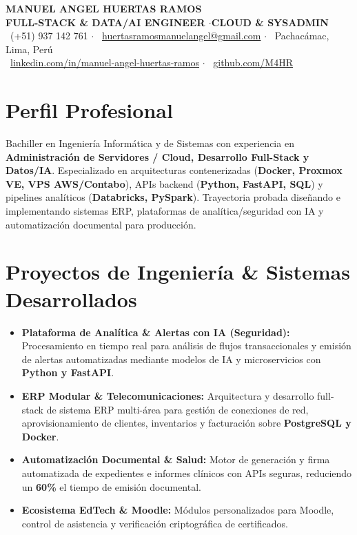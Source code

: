 \documentclass[10pt, a4paper]{article}
\begin{document}
\begin{center}
    {\LARGE \scshape \bfseries \color{primary} MANUEL ANGEL HUERTAS RAMOS}\\[0.2em]
    {\small \bfseries \color{subtitle} FULL-STACK \& DATA/AI ENGINEER \quad$\cdot$\quad CLOUD \& SYSADMIN}\\[0.25em]
    {\footnotesize
    \faPhone\ (+51) 937 142 761 \quad$\cdot$\quad
    \faEnvelope\ \href{mailto:huertasramosmanuelangel@gmail.com}{huertasramosmanuelangel@gmail.com} \quad$\cdot$\quad
    \faMapMarker*\ Pachacámac, Lima, Perú\\[0.15em]
    \faLinkedin\ \href{https://www.linkedin.com/in/manuel-angel-huertas-ramos-7b588a196/}{linkedin.com/in/manuel-angel-huertas-ramos} \quad$\cdot$\quad
    \faGithub\ \href{https://github.com/M4HR}{github.com/M4HR}
    }
\end{center}

\vspace{-0.35em}

\section{Perfil Profesional}
\noindent Bachiller en Ingeniería Informática y de Sistemas con experiencia en \textbf{Administración de Servidores / Cloud, Desarrollo Full-Stack y Datos/IA}. Especializado en arquitecturas contenerizadas (\textbf{Docker, Proxmox VE, VPS AWS/Contabo}), APIs backend (\textbf{Python, FastAPI, SQL}) y pipelines analíticos (\textbf{Databricks, PySpark}). Trayectoria probada diseñando e implementando sistemas ERP, plataformas de analítica/seguridad con IA y automatización documental para producción.

\section{Proyectos de Ingeniería \& Sistemas Desarrollados}
\begin{itemize}
    \item \textbf{Plataforma de Analítica \& Alertas con IA (Seguridad):} Procesamiento en tiempo real para análisis de flujos transaccionales y emisión de alertas automatizadas mediante modelos de IA y microservicios con \textbf{Python y FastAPI}.
    \item \textbf{ERP Modular \& Telecomunicaciones:} Arquitectura y desarrollo full-stack de sistema ERP multi-área para gestión de conexiones de red, aprovisionamiento de clientes, inventarios y facturación sobre \textbf{PostgreSQL y Docker}.
    \item \textbf{Automatización Documental \& Salud:} Motor de generación y firma automatizada de expedientes e informes clínicos con APIs seguras, reduciendo un \textbf{60\%} el tiempo de emisión documental.
    \item \textbf{Ecosistema EdTech \& Moodle:} Módulos personalizados para Moodle, control de asistencia y verificación criptográfica de certificados.
\end{itemize}
\end{document}
